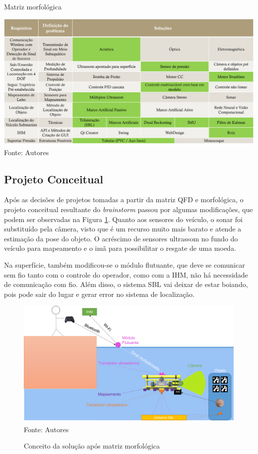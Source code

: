 \begin{table}[h!]
	\centering
	\caption{Matriz morfológica}
	\label{tab:matriz-morfologica}
	\includegraphics[width=1\linewidth]{images/Matriz-morfologica}\\
	\footnotesize Fonte: Autores
\end{table}

\subsection{Projeto Conceitual}
\label{subsec:projeto-conceitual}

Após as decisões de projetos tomadas a partir da matriz QFD e morfológica, o projeto conceitual resultante do \textit{brainstorm} passou por algumas modificações, que podem ser observadas na Figura \ref{fig:conceito-final}. Quanto aos sensores do veículo, o sonar foi substituído pela câmera, visto que é um recurso muito mais barato e atende a estimação da pose do objeto. O acréscimo de sensores ultrassom no fundo do veículo para mapeamento e o imã para possibilitar o resgate de uma moeda.

Na superfície, também modificou-se o módulo flutuante, que deve se comunicar sem fio tanto com o controle do operador, como com a IHM, não há necessidade de comunicação com fio. Além disso, o sistema SBL vai deixar de estar boiando, pois pode sair do lugar e gerar error no sistema de localização.  

\begin{figure}[h]
	\centering
	\caption{Conceito da solução após matriz morfológica}
	\label{fig:conceito-final}
	\includegraphics[width=1\linewidth]{images/conceito-final}\\
	\footnotesize Fonte: Autores
\end{figure}

